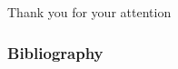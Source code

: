 \documentclass{beamer}
\begin{document}
\begin{comment}
\begin{frame}
  \frametitle{Work in Progress}
  \begin{columns}
  \column{0.5\textwidth}
\onslide<1->
    \begin{itemize}
    \item Implement the $F_4$ lattice in the simulation program and make efficiency studies;
    \vspace{5\baselineskip}
\onslide<2->
    \item Make a rotational invariance study on the new lattice, hoping to get better results than the Simple Hypercubic lattice.
    \end{itemize}
    
\onslide<1->
  \column{0.1\textwidth}
  \column{0.3\textwidth}
    \texttt{[image: F4\_root\_lattice.png]}\\
    \vspace{\baselineskip}
\onslide<2->
    \texttt{[image: plots/XY\_Plane\_nt6\_ns16\_beta2.35\_copied.png]}
  \end{columns}
\end{frame}
\end{comment}

\begin{frame}
  \centering
  \Huge
  Thank you for your attention
\end{frame}

\begin{frame}[allowframebreaks]
  \frametitle{Bibliography}
  \printbibliography
\end{frame}
\end{document}
